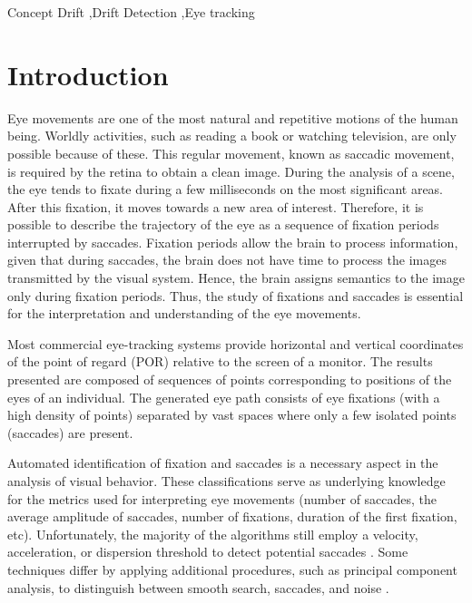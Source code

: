 \documentclass[preprint,12pt]{elsarticle}
\begin{document}
\begin{frontmatter}
\begin{abstract}
\end{abstract}

\begin{keyword}
Concept Drift \sep Drift Detection \sep Eye tracking
\end{keyword}

\end{frontmatter}

\linenumbers

\section{Introduction}
\label{sec:intro}


Eye movements are one of the most natural and repetitive motions of the human being.
Worldly activities, such as reading a book or watching television, are only possible because of these.
This regular movement, known as saccadic movement, is required by the retina to obtain a clean image.
%
During the analysis of a scene, the eye tends to fixate during a few milliseconds on the most significant areas.
After this fixation, it moves towards a new area of interest.
%
Therefore, it is possible to describe the trajectory of the eye as a sequence of fixation periods interrupted by saccades.
%
Fixation periods allow the brain to process information, given that during saccades, the brain does not have time to process the images transmitted by the visual system.
%
Hence, the brain assigns semantics to the image only during fixation periods.
Thus, the study of fixations and saccades is essential for the interpretation and understanding of the eye movements.

Most commercial eye-tracking systems provide horizontal and vertical coordinates of the point of regard (POR) relative to the screen of a monitor.
The results presented are composed of sequences of points corresponding to positions of the eyes of an individual.
The generated eye path consists of eye fixations (with a high density of points) separated by vast spaces where only a few isolated points (saccades) are present.

Automated identification of fixation and saccades is a necessary aspect in the analysis of visual behavior.
These classifications serve as underlying knowledge for the metrics used for interpreting eye movements (number of saccades, the average amplitude of saccades, number of fixations, duration of the first fixation, etc).
%
Unfortunately, the majority of the algorithms still employ a velocity, acceleration, or dispersion threshold to detect potential saccades \cite{otero:jorge:troncoso:saccades_and_fixations}.
Some techniques differ by applying additional procedures, such as principal component analysis, to distinguish between smooth search, saccades, and noise \cite{Berg2009}.
%
\end{document}
